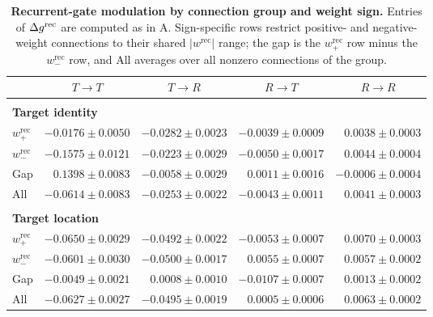 \begin{table}[t]
\caption{\textbf{Recurrent-gate modulation by connection group and weight sign.} Entries of \(\Delta g^{\mathrm{rec}}\) are computed as in A. Sign-specific rows restrict positive- and negative-weight connections to their shared \(|w^{\mathrm{rec}}|\) range; the gap is the \(w^{\mathrm{rec}}_{+}\) row minus the \(w^{\mathrm{rec}}_{-}\) row, and All averages over all nonzero connections of the group.}
\label{tab:recurrent-sign-gap}
\begin{center}
\small
\setlength{\tabcolsep}{8pt}
\begin{tabular}{lrrrr}
\multicolumn{1}{c}{} &
\multicolumn{1}{c}{\bf \(T\!\to\!T\)} &
\multicolumn{1}{c}{\bf \(T\!\to\!R\)} &
\multicolumn{1}{c}{\bf \(R\!\to\!T\)} &
\multicolumn{1}{c}{\bf \(R\!\to\!R\)}
\\ \hline \\
\multicolumn{5}{l}{\bf Target identity} \\
\(w^{\mathrm{rec}}_{+}\) & \(-0.0176 \pm 0.0050\) & \(-0.0282 \pm 0.0023\) & \(-0.0039 \pm 0.0009\) & \(0.0038 \pm 0.0003\) \\
\(w^{\mathrm{rec}}_{-}\) & \(-0.1575 \pm 0.0121\) & \(-0.0223 \pm 0.0029\) & \(-0.0050 \pm 0.0017\) & \(0.0044 \pm 0.0004\) \\
Gap & \(0.1398 \pm 0.0083\) & \(-0.0058 \pm 0.0029\) & \(0.0011 \pm 0.0016\) & \(-0.0006 \pm 0.0004\) \\
All & \(-0.0614 \pm 0.0083\) & \(-0.0253 \pm 0.0022\) & \(-0.0043 \pm 0.0011\) & \(0.0041 \pm 0.0003\) \\
\hline \\
\multicolumn{5}{l}{\bf Target location} \\
\(w^{\mathrm{rec}}_{+}\) & \(-0.0650 \pm 0.0029\) & \(-0.0492 \pm 0.0022\) & \(-0.0053 \pm 0.0007\) & \(0.0070 \pm 0.0003\) \\
\(w^{\mathrm{rec}}_{-}\) & \(-0.0601 \pm 0.0030\) & \(-0.0500 \pm 0.0017\) & \(0.0055 \pm 0.0007\) & \(0.0057 \pm 0.0002\) \\
Gap & \(-0.0049 \pm 0.0021\) & \(0.0008 \pm 0.0010\) & \(-0.0107 \pm 0.0007\) & \(0.0013 \pm 0.0002\) \\
All & \(-0.0627 \pm 0.0027\) & \(-0.0495 \pm 0.0019\) & \(0.0005 \pm 0.0006\) & \(0.0063 \pm 0.0002\) \\
\end{tabular}
\end{center}
\end{table}

